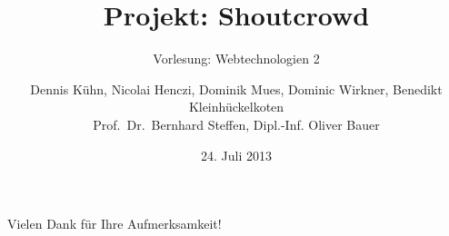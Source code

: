 \documentclass[xcolor={usenames,dvipsnames}, compress, 10pt]{beamer}
\begin{document}
\title[Projekt: Shoutcrowd]{Projekt: Shoutcrowd}
\subtitle[W2]{Vorlesung: Webtechnologien 2}
\date{24. Juli 2013}
\author[Kühn, Henczi, Mues, Wirkner, Kleinhückelkoten]{Dennis Kühn, Nicolai Henczi, Dominik Mues, Dominic Wirkner, Benedikt Kleinhückelkoten\\ {\scriptsize Prof.\ Dr.\ Bernhard Steffen, Dipl.-Inf. Oliver Bauer}} 

\nocite{*}

\frame{\titlepage}

\begin{frame}
\tableofcontents
\end{frame}			



\section*{}
\begin{frame}{Vielen Dank f\"ur Ihre Aufmerksamkeit!}
\end{frame}
\end{document}
